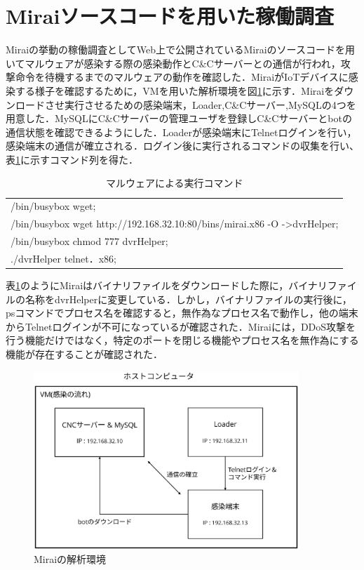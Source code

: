 \section{Miraiソースコードを用いた稼働調査}
Miraiの挙動の稼働調査としてWeb上で公開されているMiraiのソースコード\cite{code}を用いてマルウェアが感染する際の感染動作とC\&Cサーバーとの通信が行われ，攻撃命令を待機するまでのマルウェアの動作を確認した．MiraiがIoTデバイスに感染する様子を確認するために，VMを用いた解析環境を図\ref{fig:kaiseki}に示す．Miraiをダウンロードさせ実行させるための感染端末，Loader,C\&Cサーバー,MySQLの4つを用意した．MySQLにC\&Cサーバーの管理ユーザを登録しC\&Cサーバーとbotの通信状態を確認できるようにした．Loaderが感染端末にTelnetログインを行い，感染端末の通信が確立される．ログイン後に実行されるコマンドの収集を行い、表\ref{tab:malware}に示すコマンド列を得た．
\begin{table}[t]
   \caption{マルウェアによる実行コマンド}
   \label{tab:malware}
   \centering
\begin{tabular}{p{7cm}}
\hline
/bin/busybox wget;\\
/bin/busybox wget http://192.168.32.10:80/bins/mirai.x86 -O -\textgreater dvrHelper;\\
/bin/busybox chmod 777 dvrHelper;\\
./dvrHelper telnet．x86;\\
\hline
\end{tabular}
\end{table}
表\ref{tab:malware}のようにMiraiはバイナリファイルをダウンロードした際に，バイナリファイルの名称をdvrHelperに変更している．しかし，バイナリファイルの実行後に，psコマンドでプロセス名を確認すると，無作為なプロセス名で動作し，他の端末からTelnetログインが不可になっているが確認された．Miraiには，DDoS攻撃を行う機能だけではなく，特定のポートを閉じる機能やプロセス名を無作為にする機能が存在することが確認された．
 \begin{figure}[h]
 \centering
    \includegraphics[width=100mm]{figures/VM.eps}
    \caption{Miraiの解析環境}
 \label{fig:kaiseki}
 \end{figure}
 \newpage

